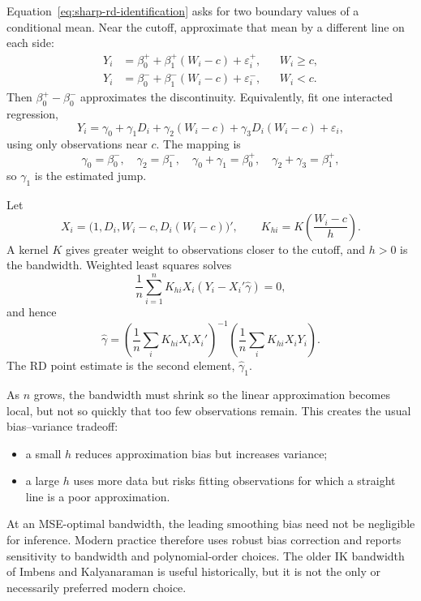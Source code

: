 Equation~\eqref{eq:sharp-rd-identification} asks for two boundary values of a
conditional mean.  Near the cutoff, approximate that mean by a different line
on each side:
\begin{align}
  Y_i&=\beta_0^+ +\beta_1^+(W_i-c)+\varepsilon_i^+,
       &&W_i\geq c,\label{eq:rd-right-line}\\
  Y_i&=\beta_0^- +\beta_1^-(W_i-c)+\varepsilon_i^-,
       &&W_i<c.\label{eq:rd-left-line}
\end{align}
Then $\beta_0^+-\beta_0^-$ approximates the discontinuity.  Equivalently, fit
one interacted regression,
\begin{equation}
  Y_i=\gamma_0+\gamma_1D_i+\gamma_2(W_i-c)
      +\gamma_3D_i(W_i-c)+\varepsilon_i,
  \label{eq:rd-local-regression}
\end{equation}
using only observations near $c$.  The mapping is
\[
  \gamma_0=\beta_0^-,\quad
  \gamma_2=\beta_1^-,\quad
  \gamma_0+\gamma_1=\beta_0^+,\quad
  \gamma_2+\gamma_3=\beta_1^+,
\]
so $\gamma_1$ is the estimated jump.

Let
\[
  X_i=\bigl(1,D_i,W_i-c,D_i(W_i-c)\bigr)',
  \qquad
  K_{hi}=K\!\left(\frac{W_i-c}{h}\right).
\]
A kernel $K$ gives greater weight to observations closer to the cutoff, and
$h>0$ is the bandwidth.  Weighted least squares solves
\begin{equation}
  \frac{1}{n}\sum_{i=1}^n K_{hi}X_i(Y_i-X_i'\widehat\gamma)=0,
  \label{eq:rd-moment}
\end{equation}
and hence
\begin{equation}
  \widehat\gamma=
  \left(\frac{1}{n}\sum_i K_{hi}X_iX_i'\right)^{-1}
  \left(\frac{1}{n}\sum_i K_{hi}X_iY_i\right).
  \label{eq:rd-wls}
\end{equation}
The RD point estimate is the second element, $\widehat\gamma_1$.

As $n$ grows, the bandwidth must shrink so the linear approximation becomes
local, but not so quickly that too few observations remain.  This creates the
usual bias--variance tradeoff:
\begin{itemize}
  \item a small $h$ reduces approximation bias but increases variance;
  \item a large $h$ uses more data but risks fitting observations for which a
        straight line is a poor approximation.
\end{itemize}
At an MSE-optimal bandwidth, the leading smoothing bias need not be negligible
for inference.  Modern practice therefore uses robust bias correction and
reports sensitivity to bandwidth and polynomial-order choices.  The older IK
bandwidth of Imbens and Kalyanaraman is useful historically, but it is not the
only or necessarily preferred modern choice.

